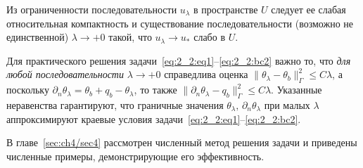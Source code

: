 \begin{remark}
    Из ограниченности последовательности $u_\lambda$
    в пространстве $U$ следует
    ее слабая относительная компактность и существование последовательности
    (возможно не единственной) $\lambda\to+0$ такой, что
    $u_\lambda \rightarrow u_*$ слабо в $U$.
\end{remark}

Для практического решения задачи~\eqref{eq:2_2:eq1}--\eqref{eq:2_2:bc2} важно то,
что \textit{для любой последовательности} $\lambda\to+0$ справедлива оценка
$\|\theta_\lambda -\theta_b\|^2_\Gamma\leq C\lambda$,
а поскольку $\partial_n\theta_\lambda=\theta_b+q_b-\theta_\lambda$,
то также $\|\partial_n\theta_\lambda-q_b\|^2_\Gamma\leq C\lambda$.
Указанные неравенства гарантируют, что граничные значения
$\theta_\lambda,\,\partial_n\theta_\lambda$ при малых $\lambda$
аппроксимируют краевые условия задачи~\eqref{eq:2_2:eq1}--\eqref{eq:2_2:bc2}.

В главе~\ref{sec:ch4/sec4} рассмотрен численный метод решения задачи
и приведены численные примеры, демонстрирующие его эффективность.
